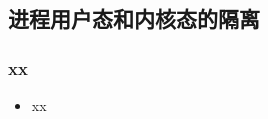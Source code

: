 \subsection{进程用户态和内核态的隔离} %
\begin{frame}
    \frametitle{xx}
    \begin{itemize}
        \item xx
    \end{itemize}
\end{frame}
% 
% 
% 
% 
% 
% 
% 
% 
% 
% 
% 
% 
% 


